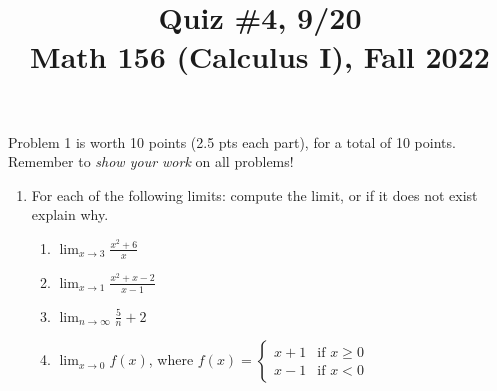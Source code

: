 \documentclass[11pt]{article}
\title{Quiz \#4, 9/20 \\ Math 156 (Calculus I), Fall 2022}
\date{}
\begin{document}
\maketitle

\thispagestyle{empty}

\vspace{-1cm}

Problem 1 is worth 10 points (2.5 pts each part), for a total of 10 points. Remember to \emph{show your work} on all problems!

\begin{enumerate}
\item For each of the following limits: compute the limit, or if it does not exist explain why.
\begin{enumerate}
\item $\displaystyle \lim_{x \to 3} \frac{x^2+6}{x}$
\item $\displaystyle \lim_{x \to 1} \frac{x^2+x-2}{x-1}$
\item $\displaystyle \lim_{n \to \infty} \frac{5}{n} + 2$
\item $\displaystyle \lim_{x \to 0} f(x)$, where $f(x) = \begin{cases} x+1 &\textrm{if $x \geq 0$} \\ x-1 &\textrm{if $x < 0$} \end{cases}$
\end{enumerate}
\end{enumerate}
\end{document}
